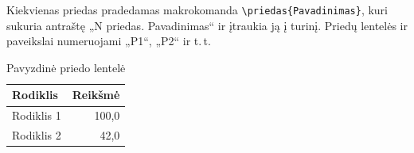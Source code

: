 Kiekvienas priedas pradedamas makrokomanda \verb|\priedas{Pavadinimas}|, kuri sukuria antraštę „N priedas. Pavadinimas“ ir įtraukia ją į turinį. Priedų lentelės ir paveikslai numeruojami „P1“, „P2“ ir t.\,t.


\lipsum[1]

\begin{table}[!ht]
\caption{Pavyzdinė priedo lentelė}
\label{tab:priedas-pavyzdys}
\centering
\begin{tabular}{|p{6cm}|r|} \toprule
\textbf{Rodiklis} & \textbf{Reikšmė} \\ \midrule
Rodiklis 1 & 100{,}0 \\ \hline
Rodiklis 2 & 42{,}0 \\ \bottomrule
\end{tabular}
\end{table}


\lipsum[2]
